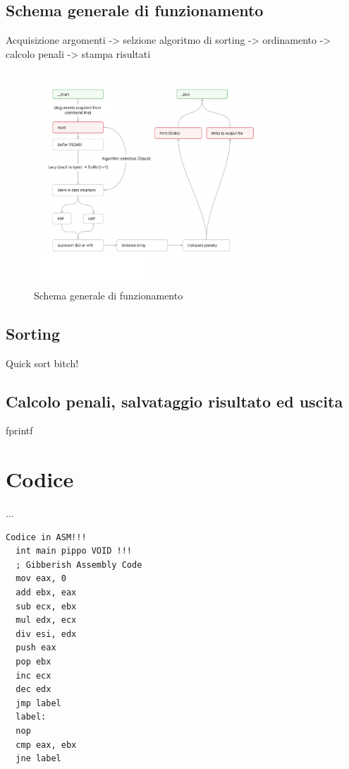 \documentclass[a4paper]{report}
\begin{document}
\subsection{Schema generale di funzionamento}


Acquisizione argomenti -> selzione algoritmo di sorting -> ordinamento -> calcolo penali -> stampa risultati

\begin{figure}[H]
  \centering
  \includegraphics[width=0.8\textwidth]{schema.png}
  \caption{Schema generale di funzionamento}
  \label{fig:schema}
\end{figure}

\subsection{Sorting}
Quick sort bitch!

\subsection{Calcolo penali, salvataggio risultato ed uscita}
fprintf


\section{Codice}

...  

\begin{lstlisting}[firstnumber=34]
  Codice in ASM!!!
  int main pippo VOID !!!
  ; Gibberish Assembly Code
  mov eax, 0
  add ebx, eax
  sub ecx, ebx
  mul edx, ecx
  div esi, edx
  push eax
  pop ebx
  inc ecx
  dec edx
  jmp label
  label:
  nop
  cmp eax, ebx
  jne label

\end{lstlisting}


\vspace{20pt}
\end{document}
